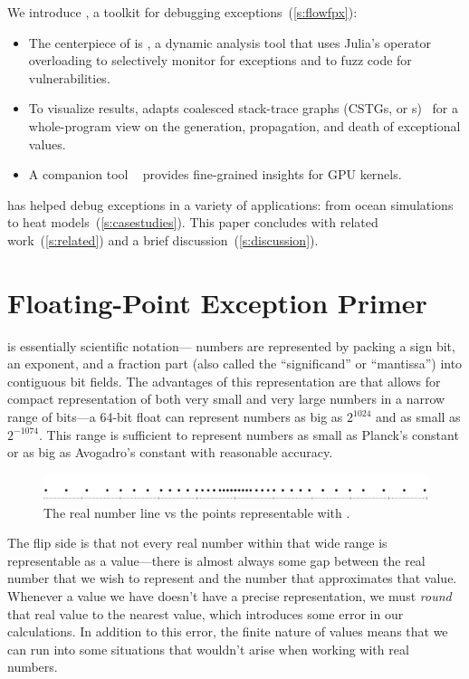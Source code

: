 \documentclass{juliacon}
\begin{document}
We introduce \FlowFPX{}, a toolkit for debugging
\fp{} exceptions~(\cref{s:flowfpx}):
\begin{itemize}
  \item
    The centerpiece of \FlowFPX{} is \FT{}, a dynamic analysis tool that uses
    Julia's operator overloading to selectively monitor for exceptions and to
    fuzz code for vulnerabilities.
  \item
    To visualize results, \FT{} adapts coalesced stack-trace graphs 
    (CSTGs, or \CSTG{}s)~\cite{humphreySystematicDebuggingMethods2014} for a whole-program view on the generation,
    propagation, and death of exceptional values.
  \item A companion tool \GPUFPX{}~\cite{llsflg-hpdc-2023} provides fine-grained insights for GPU kernels.
\end{itemize}
%
\FlowFPX{} has helped debug exceptions in a variety
of applications: from ocean simulations to heat models~(\cref{s:casestudies}).
This paper concludes with related work~(\cref{s:related}) and a
brief discussion~(\cref{s:discussion}).

\section{Floating-Point Exception Primer}
\label{s:background}

\Fp{} is essentially scientific notation---\fp{} numbers are represented by packing a sign bit, an exponent, and a fraction part (also called the ``significand'' or ``mantissa'') into contiguous bit fields.
The advantages of this representation are that allows for compact representation of both very small and very large numbers in a narrow range of bits---a 64-bit float can represent numbers as big as $2^{1024}$ and as small as $2^{-1074}$.
This range is sufficient to represent numbers as small as Planck's constant or as big as Avogadro's constant with reasonable accuracy.

\begin{figure}[h]
  \label{fig:real_vs_float}
  \includegraphics[width=\columnwidth]{fig/real_vs_fp.png}
  \caption{The real number line vs the points representable with \fp{}.}
\end{figure}

The flip side is that not every real number within that wide range is representable as a \fp{} value---there is almost always some gap between the real number that we wish to represent and the \fp{} number that approximates that value.
Whenever a value we have doesn't have a precise representation, we must \emph{round} that real value to the nearest \fp{} value, which introduces some error in our calculations.
In addition to this error, the finite nature of \fp{} values means that we can run into some situations that wouldn't arise when working with real numbers.
\end{document}
